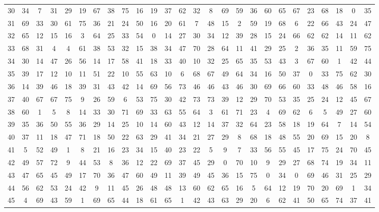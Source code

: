 \begin{table}
\begin{tabular}{c c c c c c c c c c c c c c c c c c c c c c c c c c }
30 & 34 & 7 & 31 & 29 & 19 & 67 & 38 & 75 & 16 & 19 & 37 & 62 & 32 & 8 & 69 & 59 & 36 & 60 & 65 & 67 & 23 & 68 & 18 & 0 & 35 \\
31 & 69 & 33 & 30 & 61 & 75 & 36 & 21 & 24 & 50 & 16 & 20 & 61 & 7 & 48 & 15 & 2 & 59 & 19 & 68 & 6 & 22 & 66 & 43 & 24 & 47 \\
32 & 65 & 12 & 15 & 16 & 3 & 64 & 25 & 33 & 54 & 0 & 14 & 27 & 30 & 34 & 12 & 39 & 28 & 15 & 24 & 66 & 62 & 62 & 14 & 11 & 62 \\
33 & 68 & 31 & 4 & 4 & 61 & 38 & 53 & 32 & 15 & 38 & 34 & 47 & 70 & 28 & 64 & 11 & 41 & 29 & 25 & 2 & 36 & 35 & 11 & 59 & 75 \\
34 & 30 & 14 & 47 & 26 & 56 & 14 & 17 & 58 & 41 & 18 & 33 & 40 & 10 & 32 & 25 & 65 & 35 & 53 & 43 & 3 & 67 & 60 & 1 & 42 & 44 \\
35 & 39 & 17 & 12 & 10 & 11 & 51 & 22 & 10 & 55 & 63 & 10 & 6 & 68 & 67 & 49 & 64 & 34 & 16 & 50 & 37 & 0 & 33 & 75 & 62 & 30 \\
36 & 14 & 39 & 46 & 18 & 39 & 31 & 43 & 42 & 14 & 69 & 56 & 73 & 46 & 46 & 43 & 46 & 30 & 69 & 66 & 60 & 33 & 48 & 46 & 58 & 16 \\
37 & 40 & 67 & 67 & 75 & 9 & 26 & 59 & 6 & 53 & 75 & 30 & 42 & 73 & 73 & 39 & 12 & 29 & 70 & 53 & 35 & 25 & 24 & 12 & 45 & 67 \\
38 & 60 & 1 & 5 & 8 & 14 & 33 & 30 & 71 & 69 & 33 & 63 & 55 & 64 & 3 & 61 & 71 & 23 & 4 & 69 & 62 & 6 & 5 & 49 & 27 & 60 \\
39 & 35 & 36 & 50 & 55 & 36 & 29 & 14 & 25 & 10 & 14 & 60 & 43 & 12 & 14 & 37 & 32 & 64 & 23 & 58 & 18 & 19 & 64 & 7 & 14 & 54 \\
40 & 37 & 11 & 18 & 47 & 71 & 18 & 50 & 22 & 63 & 29 & 41 & 34 & 21 & 27 & 29 & 8 & 68 & 18 & 48 & 55 & 20 & 69 & 15 & 20 & 8 \\
41 & 5 & 52 & 49 & 1 & 8 & 21 & 16 & 23 & 34 & 15 & 40 & 23 & 22 & 5 & 9 & 7 & 33 & 56 & 55 & 45 & 17 & 75 & 24 & 70 & 45 \\
42 & 49 & 57 & 72 & 9 & 44 & 53 & 8 & 36 & 12 & 22 & 69 & 37 & 45 & 29 & 0 & 70 & 10 & 9 & 29 & 27 & 68 & 74 & 19 & 34 & 11 \\
43 & 47 & 65 & 45 & 49 & 17 & 70 & 36 & 47 & 60 & 49 & 11 & 39 & 49 & 45 & 36 & 15 & 75 & 0 & 34 & 0 & 69 & 46 & 31 & 25 & 29 \\
44 & 56 & 62 & 53 & 24 & 42 & 9 & 11 & 45 & 26 & 48 & 48 & 13 & 60 & 62 & 65 & 16 & 5 & 64 & 12 & 19 & 70 & 20 & 69 & 1 & 34 \\
45 & 4 & 69 & 43 & 59 & 1 & 69 & 65 & 44 & 18 & 61 & 65 & 1 & 42 & 43 & 63 & 29 & 20 & 6 & 62 & 41 & 50 & 65 & 74 & 37 & 41 \\

\end{tabular}
\end{table}

